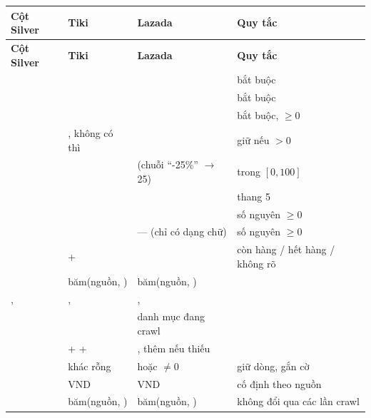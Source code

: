 \documentclass[11pt,a4paper]{article}
\begin{document}
\begin{xltabular}{\linewidth}{@{}L{30mm}L{34mm}L{34mm}Y@{}}
  \toprule
  \textbf{Cột Silver} & \textbf{Tiki} & \textbf{Lazada} & \textbf{Quy tắc} \\
  \midrule
  \endfirsthead
  \toprule \textbf{Cột Silver} & \textbf{Tiki} & \textbf{Lazada} & \textbf{Quy tắc} \\ \midrule
  \endhead
   &  &  & bắt buộc \\
   &  &  & bắt buộc \\
   &  &  & bắt buộc, $\ge 0$ \\
   & , không có thì  &  & giữ nếu $> 0$ \\
   &  &  (chuỗi ``-25\%'' $\to$ 25) & trong $[0, 100]$ \\
   &  &  & thang 5 \\
   &  &  & số nguyên $\ge 0$ \\
   &  & --- (chỉ có dạng chữ) & số nguyên $\ge 0$ \\
   &  +  &  & còn hàng / hết hàng / không rõ \\
   & băm(nguồn, ) & băm(nguồn, ) & \\
  ,  & ,  & ,  & \\
   &  & danh mục đang crawl & \\
   &  +  +  & , thêm  nếu thiếu & \\
   &  khác rỗng &  hoặc  $\ne 0$ & giữ dòng, gắn cờ \\
   & VND & VND & cố định theo nguồn \\
   & băm(nguồn, ) & băm(nguồn, ) & không đổi qua các lần crawl \\
  \bottomrule
\end{xltabular}
\end{document}
